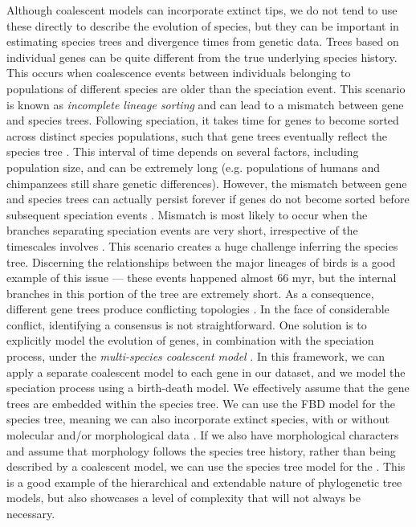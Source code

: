 Although coalescent models can incorporate extinct tips, we do not tend to use these directly to describe the evolution of species, but they can be important in estimating species trees and divergence times from genetic data. %
Trees based on individual genes can be quite different from the true underlying species history. 
This occurs when coalescence events between individuals belonging to populations of different species are older than the speciation event.
This scenario is known as \textit{incomplete lineage sorting} and can lead to a mismatch between gene and species trees.
Following speciation, it takes time for genes to become sorted across distinct species populations, such that gene trees  eventually reflect the species tree \citep{Maddison2006}.
This interval of time depends on several factors, including population size, and can be extremely long (e.g. populations of humans and chimpanzees still share genetic differences). 
However, the mismatch between gene and species trees can actually persist forever if genes do not become sorted before subsequent speciation events \citep{Xu2016}. 
Mismatch is most likely to occur when the branches separating speciation events are very short, irrespective of the timescales involves . This scenario creates a huge challenge  inferring the species tree.
Discerning the relationships between the major lineages of birds is a good example of this issue --- these events happened almost 66 myr, but the internal branches in this portion of the tree are extremely short. As a consequence, different gene trees produce conflicting topologies \citep{Jarvis2014}.
In the face of considerable conflict, identifying a consensus is not straightforward. 
One solution is to explicitly model the evolution of genes, in combination with the speciation process, under the \textit{multi-species coalescent model} \citep{Heled2010}.
In this framework, we can apply a separate coalescent model to each gene in our dataset, and we model the speciation process using a birth-death model. 
We effectively assume that the gene trees are embedded within the species tree.
We can use the FBD model for the species tree, meaning we can also incorporate extinct species, with or without molecular and/or morphological data \citep{ogilvie2018}.
If we also have morphological characters and assume that morphology follows the species tree history, rather than being described by a coalescent model, we can use the species tree model for the .
This is a good example of the hierarchical and extendable nature of phylogenetic tree models, but also showcases a level of complexity that will not always be necessary.

